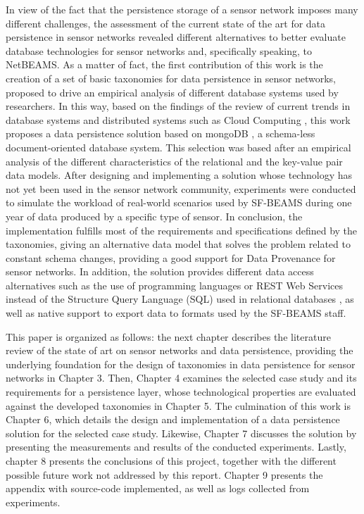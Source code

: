In view of the fact that the persistence storage of a sensor network imposes
many different challenges, the assessment of the current state of the art for
data persistence in sensor networks revealed different alternatives to better
evaluate database technologies for sensor networks and, specifically speaking,
to NetBEAMS. As a matter of fact, the first contribution of this work is the
creation of a set of basic taxonomies for data persistence in sensor networks,
proposed to drive an empirical analysis of different database systems used by
researchers. In this way, based on the findings of the review of current trends
in database systems \cite{db-is-rdbs-dommed, db-shard-intro} and distributed
systems such as Cloud Computing \cite{cloud-comp-survey}, this work proposes a
data persistence solution based on mongoDB \cite{mongodb}, a schema-less
document-oriented database system. This selection was based after an empirical
analysis of the different characteristics of the relational
\cite{relational-model} and the key-value pair \cite{db-kvp} data models.
After designing and implementing a solution whose technology has not yet been
used in the sensor network community, experiments were conducted to simulate
the workload of real-world scenarios used by SF-BEAMS during one year of data
produced by a specific type of sensor. In conclusion, the implementation
fulfills most of the requirements and specifications defined by the taxonomies,
giving an alternative data model that solves the problem related to constant
schema changes, providing a good support for Data Provenance
\cite{sn-provenance} for sensor networks. In addition, the solution provides
different data access alternatives such as the use of programming languages or
REST Web Services \cite{http-rest} instead of the Structure Query Language (SQL)
\cite{sql} used in relational databases \cite{relational-model}, as well as
native support to export data to formats used by the SF-BEAMS staff.

This paper is organized as follows: the next chapter describes the literature
review of the state of art on sensor networks and data persistence, providing
the underlying foundation for the design of taxonomies in data persistence for
sensor networks in Chapter 3. Then, Chapter 4 examines the selected case study
and its requirements for a persistence layer, whose technological properties are
evaluated against the developed taxonomies in Chapter 5. The culmination of
this work is Chapter 6, which details the design and implementation of a data
persistence solution for the selected case study. Likewise, Chapter 7 discusses
the solution by presenting the measurements and results of the conducted
experiments. Lastly, chapter 8 presents the conclusions of this
project, together with the different possible future work not addressed by this
report. Chapter 9 presents the appendix with source-code implemented, as well as
logs collected from experiments.
